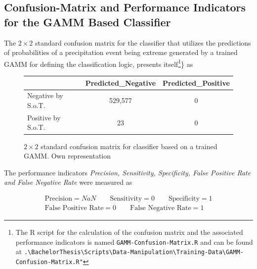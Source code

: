 \documentclass[
  12pt,
]{article}
\begin{document}
\clearpage

\hypertarget{confusion-matrix-and-performance-indicators-for-the-gamm-based-classifier}{%
\subsection{Confusion-Matrix and Performance Indicators for the GAMM
Based
Classifier}\label{confusion-matrix-and-performance-indicators-for-the-gamm-based-classifier}}

The \(2\times2\) standard confusion matrix for the classifier that
utilizes the predictions of probabilities of a precipitation event being
extreme generated by a trained GAMM for defining the classification
logic, presents
itself\footnote{The R script for the calculation of the confusion matrix and the associated performance indicators is named \texttt{GAMM-Confusion-Matrix.R} and can be found at \texttt{.\textbackslash BachelorThesis\textbackslash Scripts\textbackslash Data-Manipulation\textbackslash Training-Data\textbackslash GAMM-Confusion-Matrix.R"}}\}
as

\vspace{0.5cm}

\begin{figure}[h]
\begin{table}[H]
\centering
\fontsize{12}{14}\selectfont
\begin{tabular}[t]{l|c|c}
\hline
  & Predicted\_Negative & Predicted\_Positive\\
\hline
Negative by S.o.T. & 529,577 & 0\\
\hline
Positive by S.o.T. & 23 & 0\\
\hline
\end{tabular}
\end{table}
\caption{\label{confusion_matrix_gamm}$2\times2$ standard confusion matrix for classifier based on a trained GAMM. Own representation}
\end{figure}

The performance indicators
\textit{Precision, Sensitivity, Specificity, False Positive Rate and False Negative Rate}
were measured as

\vspace{0.75cm}

\begin{mdframed}[leftline = true, rightline = true, bottomline = false, topline = false, frametitle = {Measurements for the classifier performance indicators}]
\setlength{\jot}{3ex}
\begin{equation}
\begin{gathered}
\text{Precision} = NaN  \qquad
\text{Sensitivity} = 0  \qquad
\text{Specificity} = 1 \\
\text{False Positive Rate}  = 0\qquad
\text{False Negative Rate} = 1
\end{gathered}
\end{equation}
\end{mdframed}
\end{document}
